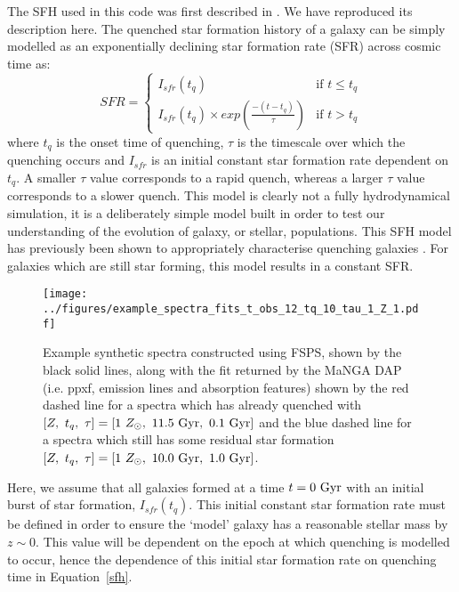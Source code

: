 \documentclass[useAMS,usenatbib]{mn2e}
\begin{document}
The SFH used in this code was first described in \cite{smethurst15}. We have reproduced its description here. The quenched star formation history of a galaxy can be simply modelled as an exponentially declining star formation rate (SFR) across cosmic time as:
\begin{equation}\label{sfh}
SFR =
\begin{cases}
I_{sfr}(t_q) & \text{if } t \leq t_q \\
I_{sfr}(t_q) \times exp{\left( \frac{-(t-t_{q})}{\tau}\right)} & \text{if } t > t_q 
\end{cases}
\end{equation}
where $t_{q}$ is the onset time of quenching, $\tau$ is the timescale over which the quenching occurs and $I_{sfr}$ is an initial constant star formation rate dependent on $t_q$.  A smaller $\tau$ value corresponds to a rapid quench, whereas a larger $\tau$ value corresponds to a slower quench. This model is clearly not a fully hydrodynamical simulation, it is a deliberately simple model built in order to test our understanding of the evolution of galaxy, or stellar, populations. This SFH model has previously been shown to appropriately characterise quenching galaxies \citep{weiner06, martin07, noeske07,schawinski14}. For galaxies which are still star forming, this model results in a constant SFR.

\begin{figure*}
\centering
\texttt{[image: ../figures/example\_spectra\_fits\_t\_obs\_12\_tq\_10\_tau\_1\_Z\_1.pdf]}
\caption{Example synthetic spectra constructed using FSPS, shown by the black solid lines, along with the fit returned by the MaNGA DAP (i.e. ppxf, emission lines and absorption features) shown by the red dashed line for a spectra which has already quenched with $[Z,~t_q,~\tau] = [1~Z_{\odot},~11.5~\rm{Gyr},~0.1~\rm{Gyr}]$ and the blue dashed line for a spectra which still has some residual star formation $[Z,~t_q,~\tau] = [1~Z_{\odot},~10.0~\rm{Gyr},~1.0~\rm{Gyr}]$.}
\label{fig:spectrafit}
\end{figure*}

Here, we assume that all galaxies formed at a time $t=0~\rm{Gyr}$ with an initial burst of star formation, $I_{sfr}(t_q)$. This initial constant star formation rate must be defined in order to ensure the `model' galaxy  has a reasonable stellar mass by $z\sim0$. This value will be dependent on the epoch at which quenching is modelled to occur, hence the dependence of this initial star formation rate on quenching time in Equation~\ref{sfh}. 
\end{document}

